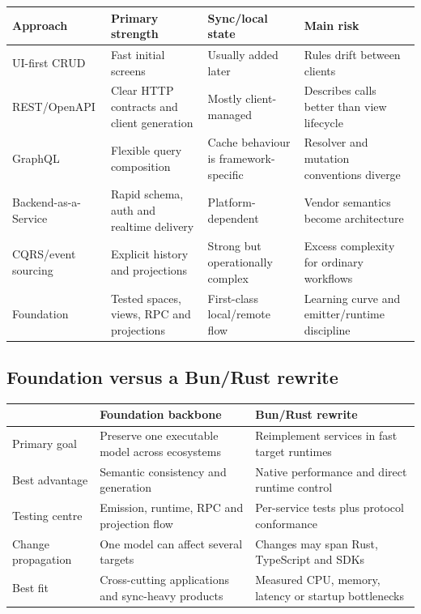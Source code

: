 \documentclass[10pt]{article}
\begin{document}
\begin{tabularx}{\textwidth}{P{28mm}YYY}
\toprule
\textbf{Approach} & \textbf{Primary strength} & \textbf{Sync/local state} & \textbf{Main risk} \\
\midrule
UI-first CRUD & Fast initial screens & Usually added later & Rules drift between clients \\
REST/OpenAPI & Clear HTTP contracts and client generation & Mostly client-managed & Describes calls better than view lifecycle \\
GraphQL & Flexible query composition & Cache behaviour is framework-specific & Resolver and mutation conventions diverge \\
Backend-as-a-Service & Rapid schema, auth and realtime delivery & Platform-dependent & Vendor semantics become architecture \\
CQRS/event sourcing & Explicit history and projections & Strong but operationally complex & Excess complexity for ordinary workflows \\
Foundation & Tested spaces, views, RPC and projections & First-class local/remote flow & Learning curve and emitter/runtime discipline \\
\bottomrule
\end{tabularx}

\subsection{Foundation versus a Bun/Rust rewrite}

\begin{tabularx}{\textwidth}{P{32mm}YY}
\toprule
 & \textbf{Foundation backbone} & \textbf{Bun/Rust rewrite} \\
\midrule
Primary goal & Preserve one executable model across ecosystems & Reimplement services in fast target runtimes \\
Best advantage & Semantic consistency and generation & Native performance and direct runtime control \\
Testing centre & Emission, runtime, RPC and projection flow & Per-service tests plus protocol conformance \\
Change propagation & One model can affect several targets & Changes may span Rust, TypeScript and SDKs \\
Best fit & Cross-cutting applications and sync-heavy products & Measured CPU, memory, latency or startup bottlenecks \\
\bottomrule
\end{tabularx}
\end{document}
